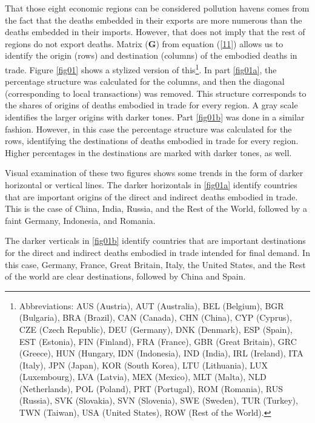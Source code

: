 \documentclass[a4paper,12pt]{article}
\begin{document}
That those eight economic regions can be considered pollution havens comes from the fact that the deaths embedded in their exports are more numerous than the deaths embedded in their imports. However, that does not imply that the rest of regions do not export deaths. Matrix ($\mathbf{G}$) from equation (\ref{11}) allows us to identify the origin (rows) and destination (columns) of the embodied deaths in trade. Figure \ref{fig01} shows a stylized version of this\footnote{Abbreviations: AUS (Austria), AUT (Australia), BEL (Belgium), BGR (Bulgaria), BRA (Brazil), CAN (Canada), CHN (China), CYP (Cyprus), CZE (Czech Republic), DEU (Germany), DNK (Denmark), ESP (Spain), EST (Estonia), FIN (Finland), FRA (France), GBR (Great Britain), GRC (Greece), HUN (Hungary, IDN (Indonesia), IND (India), IRL (Ireland), ITA (Italy), JPN (Japan), KOR (South Korea), LTU (Lithuania), LUX (Luxembourg), LVA (Latvia), MEX (Mexico), MLT (Malta), NLD (Netherlands), POL (Poland), PRT (Portugal), ROM (Romania), RUS (Russia), SVK (Slovakia), SVN (Slovenia), SWE (Sweden), TUR (Turkey), TWN (Taiwan), USA (United States), ROW (Rest of the World).}. In part \ref{fig01a}, the percentage structure was calculated for the columns, and then the diagonal (corresponding to local transactions) was removed. This structure corresponds to the shares of origins of deaths embodied in trade for every region. A gray scale identifies the larger origins with darker tones. Part \ref{fig01b} was done in a similar fashion. However, in this case the percentage structure was calculated for the rows, identifying the destinations of deaths embodied in trade for every region. Higher percentages in the destinations are marked with darker tones, as well.

Visual examination of these two figures shows some trends in the form of darker horizontal or vertical lines. The darker horizontals in \ref{fig01a} identify countries that are important origins of the direct and indirect deaths embodied in trade. This is the case of China, India, Russia, and the Rest of the World, followed by a faint Germany, Indonesia, and Romania.

The darker verticals in \ref{fig01b} identify countries that are important destinations for the direct and indirect deaths embodied in trade intended for final demand. In this case, Germany, France, Great Britain, Italy, the United States, and the Rest of the world are clear destinations, followed by China and Spain.
\end{document}
